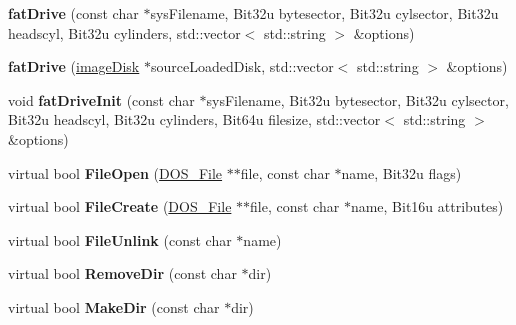 \begin{DoxyCompactItemize}
\item 
\hypertarget{classfatDrive_a7c013afd3b01a41b003be5d88229cbf9}{{\bfseries fat\-Drive} (const char $\ast$sys\-Filename, Bit32u bytesector, Bit32u cylsector, Bit32u headscyl, Bit32u cylinders, std\-::vector$<$ std\-::string $>$ \&options)}\label{classfatDrive_a7c013afd3b01a41b003be5d88229cbf9}

\item 
\hypertarget{classfatDrive_acee540d8f7ed9571f8d905920ba04615}{{\bfseries fat\-Drive} (\hyperlink{classimageDisk}{image\-Disk} $\ast$source\-Loaded\-Disk, std\-::vector$<$ std\-::string $>$ \&options)}\label{classfatDrive_acee540d8f7ed9571f8d905920ba04615}

\item 
\hypertarget{classfatDrive_a7dafc7cbf5e782c11d6e51e058e276d0}{void {\bfseries fat\-Drive\-Init} (const char $\ast$sys\-Filename, Bit32u bytesector, Bit32u cylsector, Bit32u headscyl, Bit32u cylinders, Bit64u filesize, std\-::vector$<$ std\-::string $>$ \&options)}\label{classfatDrive_a7dafc7cbf5e782c11d6e51e058e276d0}

\item 
\hypertarget{classfatDrive_a2b7f5898cbfdf595b07b0c0c7da86c10}{virtual bool {\bfseries File\-Open} (\hyperlink{classDOS__File}{D\-O\-S\-\_\-\-File} $\ast$$\ast$file, const char $\ast$name, Bit32u flags)}\label{classfatDrive_a2b7f5898cbfdf595b07b0c0c7da86c10}

\item 
\hypertarget{classfatDrive_ac070fec3dd29d777417aae60bd7c6081}{virtual bool {\bfseries File\-Create} (\hyperlink{classDOS__File}{D\-O\-S\-\_\-\-File} $\ast$$\ast$file, const char $\ast$name, Bit16u attributes)}\label{classfatDrive_ac070fec3dd29d777417aae60bd7c6081}

\item 
\hypertarget{classfatDrive_a2269b9f78159262ff4432e83ad3eaad3}{virtual bool {\bfseries File\-Unlink} (const char $\ast$name)}\label{classfatDrive_a2269b9f78159262ff4432e83ad3eaad3}

\item 
\hypertarget{classfatDrive_a63690cccb8a79e395174725f3f178773}{virtual bool {\bfseries Remove\-Dir} (const char $\ast$dir)}\label{classfatDrive_a63690cccb8a79e395174725f3f178773}

\item 
\hypertarget{classfatDrive_a3529c8adc85f6c6a1d8c2fd4156bcbae}{virtual bool {\bfseries Make\-Dir} (const char $\ast$dir)}\label{classfatDrive_a3529c8adc85f6c6a1d8c2fd4156bcbae}


\end{DoxyCompactItemize}
